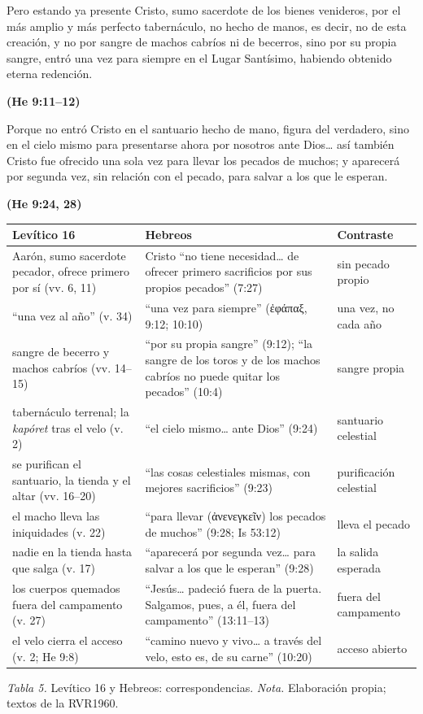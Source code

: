 \documentclass[11pt,letterpaper]{article}
\newcommand{\grc}[1]{\foreignlanguage{ancientgreek}{#1}}
\newcommand{\fuente}[1]{\par\hfill{\upshape\bfseries\small\textcolor{tierraroja}{#1}}}
\begin{document}
\begin{cita}Pero estando ya presente Cristo, sumo sacerdote de los bienes venideros, por el más amplio y más perfecto tabernáculo, no hecho de manos, es decir, no de esta creación, y no por sangre de machos cabríos ni de becerros, sino por su propia sangre, entró una vez para siempre en el Lugar Santísimo, habiendo obtenido eterna redención.\fuente{(He 9:11--12)}\end{cita}

\begin{cita}Porque no entró Cristo en el santuario hecho de mano, figura del verdadero, sino en el cielo mismo para presentarse ahora por nosotros ante Dios\ldots{} así también Cristo fue ofrecido una sola vez para llevar los pecados de muchos; y aparecerá por segunda vez, sin relación con el pecado, para salvar a los que le esperan.\fuente{(He 9:24, 28)}\end{cita}

\begin{center}\small\renewcommand{\arraystretch}{1.22}
\begin{tabular}{@{}L{5.4cm}L{5.4cm}L{3.8cm}@{}}
\toprule
\textbf{Levítico 16} & \textbf{Hebreos} & \textbf{Contraste} \\ \midrule
Aarón, sumo sacerdote pecador, ofrece primero por sí (vv. 6, 11) & Cristo ``no tiene necesidad\ldots{} de ofrecer primero sacrificios por sus propios pecados'' (7:27) & sin pecado propio \\
``una vez al año'' (v. 34) & ``una vez para siempre'' (\grc{ἐφάπαξ}, 9:12; 10:10) & una vez, no cada año \\
sangre de becerro y machos cabríos (vv. 14--15) & ``por su propia sangre'' (9:12); ``la sangre de los toros y de los machos cabríos no puede quitar los pecados'' (10:4) & sangre propia \\
tabernáculo terrenal; la \emph{kapóret} tras el velo (v. 2) & ``el cielo mismo\ldots{} ante Dios'' (9:24) & santuario celestial \\
se purifican el santuario, la tienda y el altar (vv. 16--20) & ``las cosas celestiales mismas, con mejores sacrificios'' (9:23) & purificación celestial \\
el macho lleva las iniquidades (v. 22) & ``para llevar (\grc{ἀνενεγκεῖν}) los pecados de muchos'' (9:28; Is 53:12) & lleva el pecado \\
nadie en la tienda hasta que salga (v. 17) & ``aparecerá por segunda vez\ldots{} para salvar a los que le esperan'' (9:28) & la salida esperada \\
los cuerpos quemados fuera del campamento (v. 27) & ``Jesús\ldots{} padeció fuera de la puerta. Salgamos, pues, a él, fuera del campamento'' (13:11--13) & fuera del campamento \\
el velo cierra el acceso (v. 2; He 9:8) & ``camino nuevo y vivo\ldots{} a través del velo, esto es, de su carne'' (10:20) & acceso abierto \\
\bottomrule
\end{tabular}\par
{\footnotesize\color{sepia}\textit{Tabla 5.} Levítico 16 y Hebreos: correspondencias. \textit{Nota.} Elaboración propia; textos de la RVR1960.}
\end{center}
\end{document}
